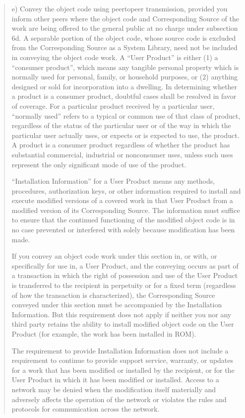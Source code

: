 \documentclass[letterpaper,10pt,english]{sphinxmanual}
\begin{document}
\begin{quote}
e) Convey the object code using peer\sphinxhyphen{}to\sphinxhyphen{}peer transmission, provided you inform other peers where the object code and Corresponding Source of the work are being offered to the general public at no charge under subsection 6d.
A separable portion of the object code, whose source code is excluded from the Corresponding Source as a System Library, need not be included in conveying the object code work.
A “User Product” is either (1) a “consumer product”, which means any tangible personal property which is normally used for personal, family, or household purposes, or (2) anything designed or sold for incorporation into a dwelling. In determining whether a product is a consumer product, doubtful cases shall be resolved in favor of coverage. For a particular product received by a particular user, “normally used” refers to a typical or common use of that class of product, regardless of the status of the particular user or of the way in which the particular user actually uses, or expects or is expected to use, the product. A product is a consumer product regardless of whether the product has substantial commercial, industrial or non\sphinxhyphen{}consumer uses, unless such uses represent the only significant mode of use of the product.

“Installation Information” for a User Product means any methods, procedures, authorization keys, or other information required to install and execute modified versions of a covered work in that User Product from a modified version of its Corresponding Source. The information must suffice to ensure that the continued functioning of the modified object code is in no case prevented or interfered with solely because modification has been made.

If you convey an object code work under this section in, or with, or specifically for use in, a User Product, and the conveying occurs as part of a transaction in which the right of possession and use of the User Product is transferred to the recipient in perpetuity or for a fixed term (regardless of how the transaction is characterized), the Corresponding Source conveyed under this section must be accompanied by the Installation Information. But this requirement does not apply if neither you nor any third party retains the ability to install modified object code on the User Product (for example, the work has been installed in ROM).

The requirement to provide Installation Information does not include a requirement to continue to provide support service, warranty, or updates for a work that has been modified or installed by the recipient, or for the User Product in which it has been modified or installed. Access to a network may be denied when the modification itself materially and adversely affects the operation of the network or violates the rules and protocols for communication across the network.


\end{quote}
\end{document}
